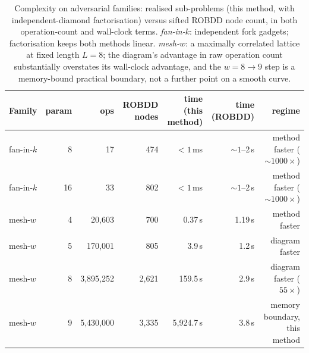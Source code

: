 \documentclass[preprint,12pt]{elsarticle}
\theoremstyle{definition}
\begin{document}
\begin{table}[t]
\centering\small
\caption{Complexity on adversarial families: realised sub-problems (this method, with independent-diamond
factorisation) versus sifted ROBDD node count, in both operation-count and wall-clock terms.
\emph{fan-in-$k$}: independent fork gadgets; factorisation keeps both methods linear. \emph{mesh-$w$}: a
maximally correlated lattice at fixed length $L{=}8$; the diagram's advantage in raw operation count
substantially overstates its wall-clock advantage, and the $w{=}8\!\to\!9$ step is a memory-bound practical
boundary, not a further point on a smooth curve.}
\label{tab:adversarial}
\begin{tabular}{lrrrrrr}
\toprule
Family & param & ops & ROBDD nodes & time (this method) & time (ROBDD) & regime \\
\midrule
fan-in-$k$ & 8  & 17        & 474       & $<\!1$\,ms & $\sim\!1$--2\,s & method faster ($\sim\!1000\times$) \\
fan-in-$k$ & 16 & 33        & 802       & $<\!1$\,ms & $\sim\!1$--2\,s & method faster ($\sim\!1000\times$) \\
mesh-$w$   & 4  & 20{,}603     & 700       & 0.37\,s    & 1.19\,s    & method faster \\
mesh-$w$   & 5  & 170{,}001    & 805       & 3.9\,s     & 1.2\,s     & diagram faster \\
mesh-$w$   & 8  & 3{,}895{,}252 & 2{,}621   & 159.5\,s   & 2.9\,s     & diagram faster ($55\times$) \\
mesh-$w$   & 9  & 5{,}430{,}000\footnotemark & 3{,}335 & 5{,}924.7\,s & 3.8\,s & memory boundary, this method \\
\bottomrule
\end{tabular}
\end{table}
\end{document}
